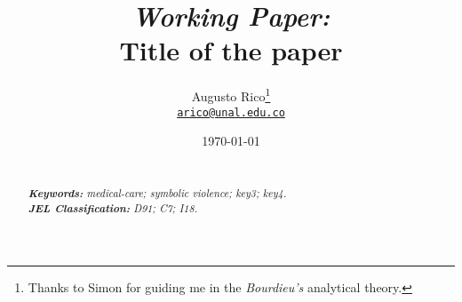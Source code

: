\documentclass[11pt]{article}
\title{\textit{Working Paper:} \\ %
    Title of the paper %
}
\author{Augusto Rico\thanks{Thanks to Simon for guiding me in the \textit{Bourdieu's} analytical theory.}\\
    \href{mailto:arico@unal.edu.co}{\texttt{arico@unal.edu.co}}
    }
\date{\today}
\begin{document}
{ %
\maketitle
\begin{abstract}
\noindent\lipsum[2] %
~\\
\textit{\textbf{Keywords: }%
medical-care; symbolic violence; key3; key4.} \\ %
\textit{\textbf{JEL Classification: }%
D91; C7; I18.} %
\end{abstract}}




\end{document}
